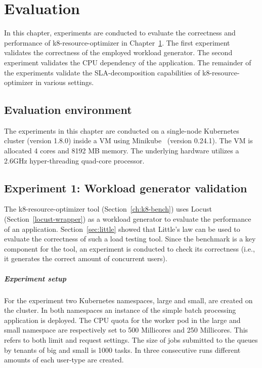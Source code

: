 \chapter{Evaluation}
\label{ch:eval}
In this chapter, experiments are conducted to evaluate the correctness and performance of k8-resource-optimizer in Chapter~\ref{ch:eval}. The first experiment validates the correctness of the employed workload generator. The second experiment validates the CPU dependency of the application. The remainder of the experiments validate the SLA-decomposition capabilities of k8-resource-optimizer in various settings.

\section{Evaluation environment}
The experiments in this chapter are conducted on a single-node Kubernetes cluster (version 1.8.0) inside a VM using Minikube~\cite{minikube-web} (version 0.24.1). The VM is allocated 4 cores and 8192 MB memory. The underlying hardware utilizes a 2.6GHz hyper-threading quad-core processor.  


\section{Experiment 1: Workload generator validation}
The k8-resource-optimizer tool (Section~\ref{ch:k8-bench}) uses Locust (Section~\ref{locust-wrapper}) as a workload generator to evaluate the performance of an application. Section~\ref{sec:little} showed that Little's law can be used to evaluate the correctness of such a load testing tool. Since the benchmark is a key component for the tool, an experiment is conducted to check its correctness (i.e., it generates the correct amount of concurrent users). 
\paragraph{Experiment setup} 
For the experiment two Kubernetes namespaces, large and small, are created on the cluster. In both namespaces  an instance of the simple batch processing application is deployed. The CPU quota for the worker pod in the large and small namespace are respectively set to 500 Millicores and 250 Millicores. This refers to both limit and request settings. The size of jobs submitted to the queues by tenants of big and small is 1000 tasks. In three consecutive runs different amounts of each user-type are created. 
